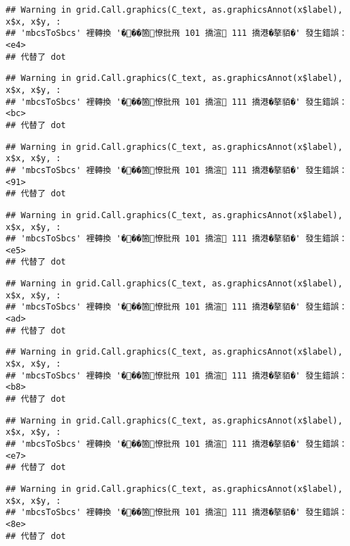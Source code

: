 \documentclass[
]{article}
\begin{document}
\begin{verbatim}
## Warning in grid.Call.graphics(C_text, as.graphicsAnnot(x$label), x$x, x$y, :
## 'mbcsToSbcs' 裡轉換 '���箇憭批飛 101 撟渲 111 撟港�摮貊�' 發生錯誤：<e4>
## 代替了 dot
\end{verbatim}

\begin{verbatim}
## Warning in grid.Call.graphics(C_text, as.graphicsAnnot(x$label), x$x, x$y, :
## 'mbcsToSbcs' 裡轉換 '���箇憭批飛 101 撟渲 111 撟港�摮貊�' 發生錯誤：<bc>
## 代替了 dot
\end{verbatim}

\begin{verbatim}
## Warning in grid.Call.graphics(C_text, as.graphicsAnnot(x$label), x$x, x$y, :
## 'mbcsToSbcs' 裡轉換 '���箇憭批飛 101 撟渲 111 撟港�摮貊�' 發生錯誤：<91>
## 代替了 dot
\end{verbatim}

\begin{verbatim}
## Warning in grid.Call.graphics(C_text, as.graphicsAnnot(x$label), x$x, x$y, :
## 'mbcsToSbcs' 裡轉換 '���箇憭批飛 101 撟渲 111 撟港�摮貊�' 發生錯誤：<e5>
## 代替了 dot
\end{verbatim}

\begin{verbatim}
## Warning in grid.Call.graphics(C_text, as.graphicsAnnot(x$label), x$x, x$y, :
## 'mbcsToSbcs' 裡轉換 '���箇憭批飛 101 撟渲 111 撟港�摮貊�' 發生錯誤：<ad>
## 代替了 dot
\end{verbatim}

\begin{verbatim}
## Warning in grid.Call.graphics(C_text, as.graphicsAnnot(x$label), x$x, x$y, :
## 'mbcsToSbcs' 裡轉換 '���箇憭批飛 101 撟渲 111 撟港�摮貊�' 發生錯誤：<b8>
## 代替了 dot
\end{verbatim}

\begin{verbatim}
## Warning in grid.Call.graphics(C_text, as.graphicsAnnot(x$label), x$x, x$y, :
## 'mbcsToSbcs' 裡轉換 '���箇憭批飛 101 撟渲 111 撟港�摮貊�' 發生錯誤：<e7>
## 代替了 dot
\end{verbatim}

\begin{verbatim}
## Warning in grid.Call.graphics(C_text, as.graphicsAnnot(x$label), x$x, x$y, :
## 'mbcsToSbcs' 裡轉換 '���箇憭批飛 101 撟渲 111 撟港�摮貊�' 發生錯誤：<8e>
## 代替了 dot
\end{verbatim}
\end{document}
